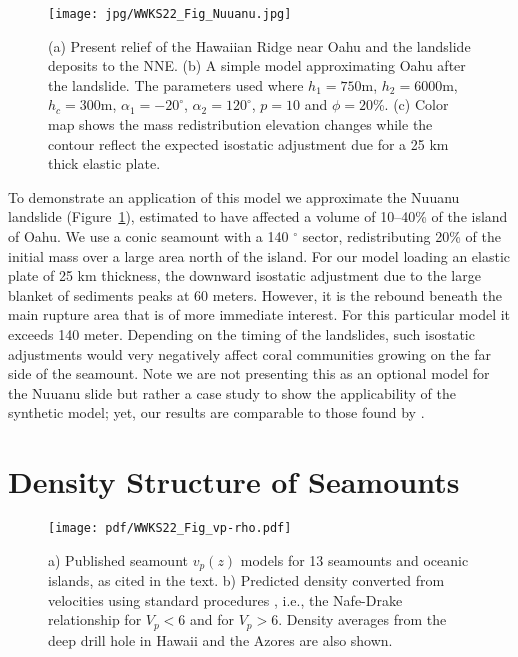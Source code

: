 \begin{figure}[h]
\centering
\texttt{[image: jpg/WWKS22\_Fig\_Nuuanu.jpg]}
\caption{(a) Present relief of the Hawaiian Ridge near Oahu and the landslide deposits to the NNE.
(b) A simple model approximating Oahu after the landslide.  The parameters used where $h_1 = 750$m, $h_2 = 6000$m,
$h_c = 300$m, $\alpha_1 = -20^{\circ}$, $\alpha_2 = 120^{\circ}$, $p = 10$ and $\phi = 20$\%.
(c) Color map shows the mass redistribution elevation changes while the contour reflect the expected isostatic adjustment due for a 25 km
thick elastic plate.}
\label{WWKS22_Fig_Nuuanu}
\end{figure}
To demonstrate an application of this model we approximate the Nuuanu landslide (Figure~\ref{WWKS22_Fig_Nuuanu}),
estimated to have affected a volume of 10--40\% of the island of Oahu. We use a conic seamount with a 140 $^{\circ}$ sector,
redistributing 20\% of the initial mass over a large area north of the island.  For our model loading an elastic plate
of 25 km thickness, the downward isostatic adjustment due to the large blanket of sediments peaks at 60 meters.  However, it is
the rebound beneath the main rupture area that is of more immediate interest.  For this particular model it exceeds
140 meter.  Depending on the timing of the landslides, such isostatic adjustments would very negatively affect coral
communities growing on the far side of the seamount. Note we are not presenting this as an optional model for the Nuuanu
slide but rather a case study to show the applicability of the synthetic model; yet, our results are comparable to those found
by \citet{SW2000}.

\section{Density Structure of Seamounts}

\begin{figure}[h]
\centering
\texttt{[image: pdf/WWKS22\_Fig\_vp-rho.pdf]}
\caption{a) Published seamount $v_p(z)$ models for 13 seamounts and oceanic islands, as cited in the text.
b) Predicted density converted from velocities using standard procedures \citep{B2005}, i.e., the Nafe-Drake relationship \citep{LND70}
for $V_p < 6$ and \citet{CM1995} for $V_p >6$. Density averages from the deep drill hole
in Hawaii \citep{JM2001} and the Azores \citep{H1979} are also shown.}
\label{WWKS22_Fig_vp-rho}
\end{figure}

